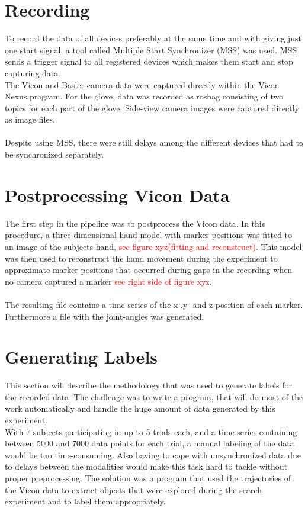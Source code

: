 \section{Recording}
To record the data of all devices preferably at the same time and with giving just one start signal, a tool called Multiple Start Synchronizer (MSS) was used. MSS sends a trigger signal to all registered devices which makes them start and stop capturing data.\\
The Vicon and Basler camera data were captured directly within the Vicon Nexus program. For the glove, data was recorded as rosbag consisting of two topics for each part of the glove. Side-view camera images were captured directly as image files.\\
\\
Despite using MSS, there were still delays among the different devices that had to be synchronized separately. 
\section{Postprocessing Vicon Data}
The first step in the pipeline was to postprocess the Vicon data. In this procedure, a three-dimensional hand model with marker positions was fitted to an image of the subjects hand, \textcolor{red}{see figure xyz(fitting and reconstruct)}. This model was then used to reconstruct the hand movement during the experiment to approximate marker positions that occurred during gaps in the recording when no camera captured a marker \textcolor{red}{see right side of figure xyz}.\\
\\
The resulting file contains a time-series of the x-,y- and z-position of each marker. Furthermore a file with the joint-angles was generated.
\section{Generating Labels}
This section will describe the methodology that was used to generate labels for the recorded data. The challenge was to write a program, that will do most of the work automatically and handle the huge amount of data generated by this experiment.\\
With 7 subjects participating in up to 5 trials each, and a time series containing between 5000 and 7000 data points for each trial, a manual labeling of the data would be too time-consuming. Also having to cope with unsynchronized data due to delays between the modalities would make this task hard to tackle without proper preprocessing. The solution was a program that used the trajectories of the Vicon data to extract objects that were explored during the search experiment and to label them appropriately.

